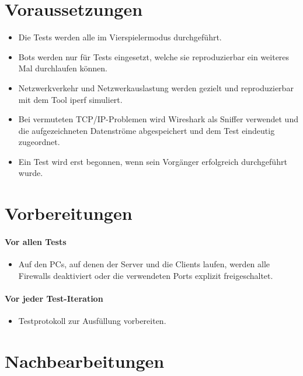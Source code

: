\documentclass[12pt,halfparskip]{scrartcl}
\begin{document}

\section{Voraussetzungen} %
\label{sec:voraussetzungen}
\begin{itemize}
	\item Die Tests werden alle im Vierspielermodus durchgeführt.
	\item Bots werden nur für Tests eingesetzt, welche sie reproduzierbar ein weiteres Mal durchlaufen können.
	\item Netzwerkverkehr und Netzwerkauslastung werden gezielt und reproduzierbar mit dem Tool iperf simuliert.
	\item Bei vermuteten TCP/IP-Problemen wird Wireshark als Sniffer verwendet und die aufgezeichneten Datenströme abgespeichert und dem Test eindeutig zugeordnet.
	\item Ein Test wird erst begonnen, wenn sein Vorgänger erfolgreich durchgeführt wurde.
\end{itemize}

\section{Vorbereitungen} %
\label{sec:vorbereitungen}
\paragraph{Vor allen Tests}\label{ssub:vorbereitungen_vor_allen_tests} %
	\begin{itemize}
		\item Auf den PCs, auf denen der Server und die Clients laufen, werden alle Firewalls deaktiviert oder die verwendeten Ports explizit freigeschaltet.
	\end{itemize}
\paragraph{Vor jeder Test-Iteration}\label{ssub:vorbereitungen_vor_jeder_testiteration} %
	\begin{itemize}
		\item Testprotokoll zur Ausfüllung vorbereiten.
	\end{itemize}

\section{Nachbearbeitungen}\label{sec:nachbearbeitungen} %
\end{document}
